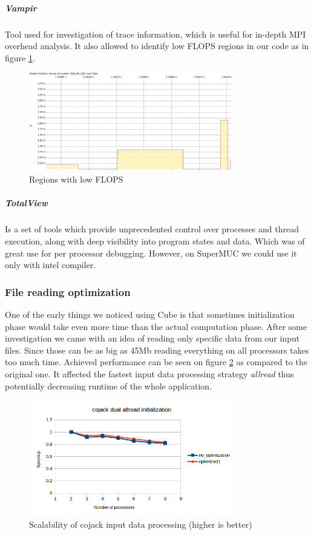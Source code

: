 \documentclass{article}
\begin{document}
\subparagraph{Vampir}
Tool used for investigation of trace information, which is useful for in-depth MPI overhead analysis. It also allowed to identify low FLOPS regions in our code as in figure \ref{fig:7}.
\begin{figure}[h!]
	\begin{center}
		\includegraphics[width=0.8\textwidth]{iter-pent-dual-allread-8-Counter_Data_Timeline_traces.png}
		\caption{Regions with low FLOPS}		
		\label{fig:7}
	\end{center}
\end{figure}

\subparagraph{TotalView}
Is a set of tools which provide unprecedented control over processes and thread execution, along with deep visibility into program states and data. Which was of great use for per processor debugging. However, on SuperMUC we could use it only with intel compiler.

\subsubsection{File reading optimization}
One of the early things we noticed using Cube is that sometimes initialization phase would take even more time than the actual computation phase. After some investigation we came with an idea of reading only specific data from our input files. Since those can be as big as 45Mb reading everything on all processors takes too much time. Achieved performance can be seen on figure \ref{fig:13} as compared to the original one. It affected the fastest input data processing strategy \textit{allread} thus potentially decreasing runtime of the whole application.
\begin{figure}[h!]
	\begin{center}
		\includegraphics[width=0.8\textwidth]{cojack_inputalgorithm_scalability.png}
		\caption{Scalability of cojack input data processing (higher is better)}
		\label{fig:13}
	\end{center}
\end{figure}
\end{document}
